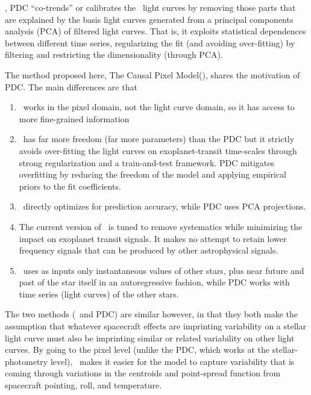  \cite{pdc2,pdc3}, PDC ``co-trends'' or calibrates the \Kepler\ light curves by removing those parts that are explained by the basis light curves generated from a principal components analysis (PCA) of filtered light curves.
That is, it exploits statistical dependences between different time series, regularizing the fit (and avoiding over-fitting) 
  by filtering and restricting the dimensionality (through PCA).

The method proposed here, The Causal Pixel Model(\name), shares the motivation of PDC.
The main differences are that
\begin{enumerate}
\item
\name\ works in the pixel domain, not the light curve domain, so it has access to more fine-grained information
\item
\name\ has far more freedom (far more parameters) than the PDC but it strictly avoids over-fitting the light curves on exoplanet-transit time-scales through strong regularization and a train-and-test framework. 
PDC mitigates overfitting by reducing the freedom of the model and applying empirical priors to the fit coefficients.
\item 
\name\ directly optimizes for prediction accuracy, while PDC uses PCA projections.
\item
The current version of \name\ is tuned to remove systematics while minimizing the impact on exoplanet transit signals. 
It makes no attempt to retain lower frequency signals that can be produced by other astrophysical signals.
\item 
\name\ uses as inputs only instantaneous values of other stars, plus near future and past of the star itself in an autoregressive fashion, while PDC works with time series (light curves) of the other stars.
\end{enumerate}

The two methods (\name\ and PDC) are similar however, in that they both make the assumption that whatever spacecraft effects are imprinting variability on a stellar light curve must also be imprinting similar or related variability on other light curves.
By going to the pixel level (unlike the PDC, which works at the stellar-photometry level), \name\ makes it easier for the model to capture variability that is coming through variations in the centroids and point-spread function from spacecraft pointing, roll, and temperature.

